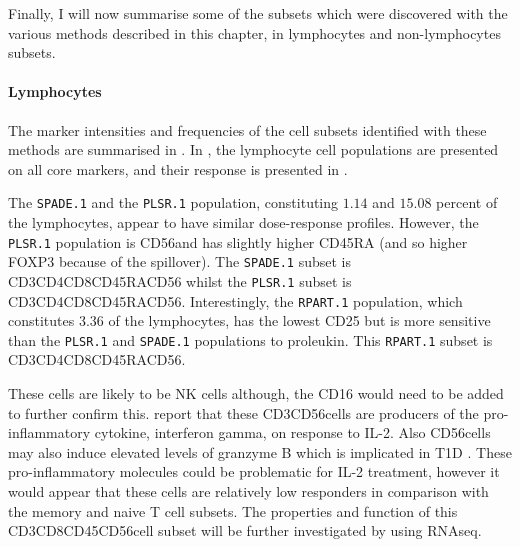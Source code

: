 Finally, I will now summarise some of the subsets which were discovered with the various methods described in this chapter, in lymphocytes and non-lymphocytes subsets.

\clearpage

\paragraph{Lymphocytes}

The marker intensities and frequencies of the cell subsets identified with these methods are summarised in .
In , the lymphocyte cell populations are presented on all core markers, and their response is presented in .

The \texttt{SPADE.1} and the \texttt{PLSR.1} population, constituting $1.14$ and $15.08$ percent of the lymphocytes, appear to have similar dose-response profiles.
However, the \texttt{PLSR.1} population is CD56\negative and has slightly higher CD45RA (and so higher FOXP3 because of the spillover).
The \texttt{SPADE.1} subset is CD3\positive CD4\negative CD8\positive CD45RA\positive CD56\positive
whilst the \texttt{PLSR.1} subset is CD3\positive CD4\negative CD8\positive CD45RA\high CD56\negative.
Interestingly, the \texttt{RPART.1} population, which constitutes 3.36 of the lymphocytes, has the lowest CD25 but is more sensitive than the \texttt{PLSR.1} and \texttt{SPADE.1} populations to proleukin.  
This \texttt{RPART.1} subset is CD3\negative CD4\negative CD8\negative CD45RA\positive CD56\positive.

These  cells are likely to be NK cells although, the CD16 would need to be added to further confirm this.
\citet{Ortaldo:1992tr} report that these CD3\negative CD56\positive cells are producers of the pro-inflammatory cytokine, interferon gamma, on response to IL-2.
Also CD56\positive cells may also induce elevated levels of granzyme B which is implicated in \gls{T1D} \citep{Thomas:2010cy}.
These pro-inflammatory molecules could be problematic for IL-2 treatment, however it would appear that these cells are relatively low responders in comparison with the memory and naive T cell subsets.
The properties and function of this CD3\negative CD8\negative CD45\positive CD56\positive cell subset will be further investigated by  using RNAseq.

